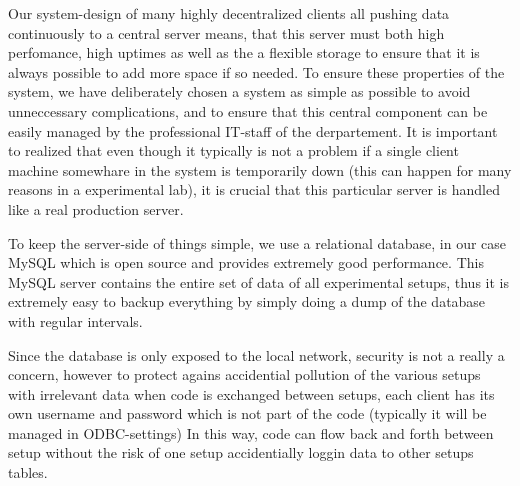 Our system-design of many highly decentralized clients all pushing data
continuously to a central server means, that this server must both high
perfomance, high uptimes as well as the a flexible storage to ensure that it is
always possible to add more space if so needed. To ensure these properties of
the system, we have deliberately chosen a system as simple as possible to avoid
unneccessary complications, and to ensure that this central component can be
easily managed by the professional IT-staff of the derpartement. It is
important to realized that even though it typically is not a problem if a
single client machine somewhare in the system is temporarily down (this can
happen for many reasons in a experimental lab), it is crucial that this
particular server is handled like a real production server.

To keep the server-side of things simple, we use a relational database, in our
case MySQL\cite{mysql} which is open source and provides extremely good
performance. This MySQL server contains the entire set of data of all
experimental setups, thus it is extremely easy to backup everything by simply
doing a dump of the database with regular intervals.

Since the database is only exposed to the local network, security is not a
really a concern, however to protect agains accidential pollution of the
various setups with irrelevant data when code is exchanged between setups, each
client has its own username and password which is not part of the code
(typically it will be managed in ODBC-settings) In this way, code can flow back
and forth between setup without the risk of one setup accidentially loggin data
to other setups tables.

